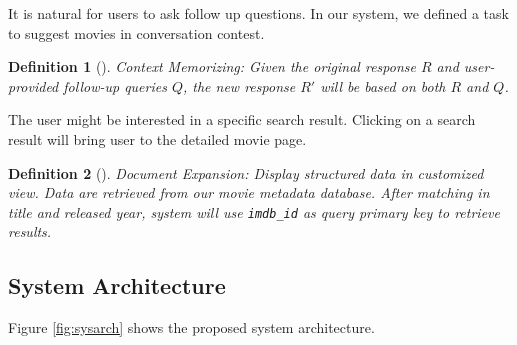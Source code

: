\documentclass[journal]{IEEEtran}
\theoremstyle{mydefstyle}
\newtheorem{definition}{Definition}[section]
\begin{document}



It is natural for users to ask follow up questions. In our system, we defined a task to suggest movies in conversation contest.

\begin{adjustwidth}{0.75cm}{} \begin{definition}[]
\textit{Context Memorizing:} Given the original response \( R \) and user-provided follow-up queries \( Q \), the new response \( R' \) will be based on both \( R \) and \( Q \).
\end{definition} \end{adjustwidth}

\vspace{10pt} 

The user might be interested in a specific search result. Clicking on a search result will bring user to the detailed movie page.

\begin{adjustwidth}{0.75cm}{} \begin{definition}[]
\textit{Document Expansion:} Display structured data in customized view. Data are retrieved from our movie metadata database. After matching in title and released year, system will use \texttt{imdb\_id} as query primary key to retrieve results.
\end{definition} \end{adjustwidth}
\vspace{10pt} 

\subsection{System Architecture}
Figure \ref{fig:sysarch} shows the proposed system architecture.
\end{document}
